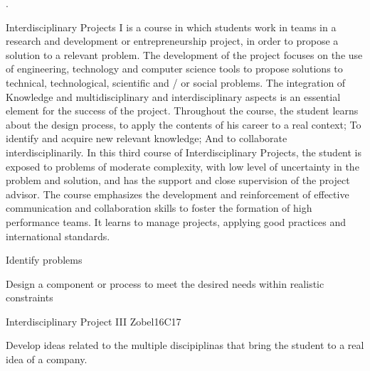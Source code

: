 \begin{syllabus}

.

\begin{justification}
Interdisciplinary Projects I is a course in which students work in teams in a research and development or entrepreneurship project, in order to propose a solution to a relevant problem. The development of the project focuses on the use of engineering, technology and computer science tools to propose solutions to technical, technological, scientific and / or social problems. The integration of
Knowledge and multidisciplinary and interdisciplinary aspects is an essential element for the success of the project. Throughout the course, the student learns about the design process, to apply the contents of his career to a real context; To identify and acquire new relevant knowledge; And to collaborate interdisciplinarily. In this third course of Interdisciplinary Projects, the student is exposed to problems of moderate complexity, with low level of uncertainty in the problem and solution, and has the support and close supervision of the project advisor. The course emphasizes the development and reinforcement of effective communication and collaboration skills to foster the formation of high performance teams. 
It learns to manage projects, applying good practices and international standards.
\end{justification}

\begin{goals}
   \item Identify problems
   \item Design a component or process to meet the desired needs within realistic constraints
   
\end{goals}


\begin{outcomes}
   \item {}
   \item {}
\end{outcomes}

\begin{competences}
    \item {}
    \item {}
\end{competences}

\begin{unit}{Interdisciplinary Project  III }{}{Zobel}{16}{C17}
\begin{topics}
      \item Develop ideas related to the multiple discipiplinas that bring the student to a real idea of a company.
\end{topics}


\end{unit}
\end{syllabus}
